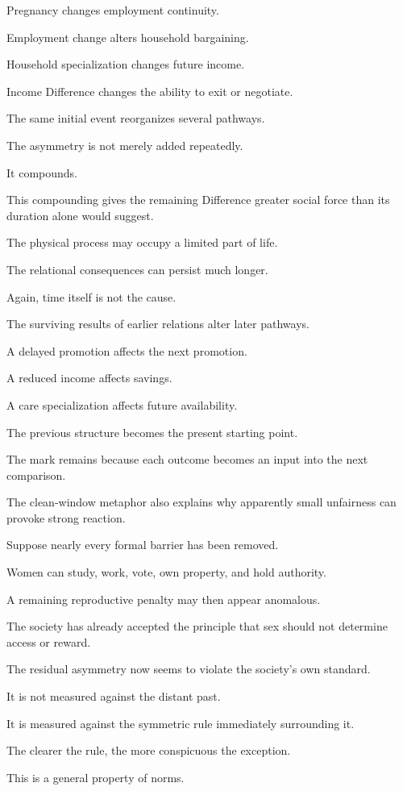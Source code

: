 Pregnancy changes employment continuity.

Employment change alters household bargaining.

Household specialization changes future income.

Income Difference changes the ability to exit or negotiate.

The same initial event reorganizes several pathways.

The asymmetry is not merely added repeatedly.

It compounds.

This compounding gives the remaining Difference greater social force than its duration alone would suggest.

The physical process may occupy a limited part of life.

The relational consequences can persist much longer.

Again, time itself is not the cause.

The surviving results of earlier relations alter later pathways.

A delayed promotion affects the next promotion.

A reduced income affects savings.

A care specialization affects future availability.

The previous structure becomes the present starting point.

The mark remains because each outcome becomes an input into the next comparison.

The clean-window metaphor also explains why apparently small unfairness can provoke strong reaction.

Suppose nearly every formal barrier has been removed.

Women can study, work, vote, own property, and hold authority.

A remaining reproductive penalty may then appear anomalous.

The society has already accepted the principle that sex should not determine access or reward.

The residual asymmetry now seems to violate the society’s own standard.

It is not measured against the distant past.

It is measured against the symmetric rule immediately surrounding it.

The clearer the rule, the more conspicuous the exception.

This is a general property of norms.

